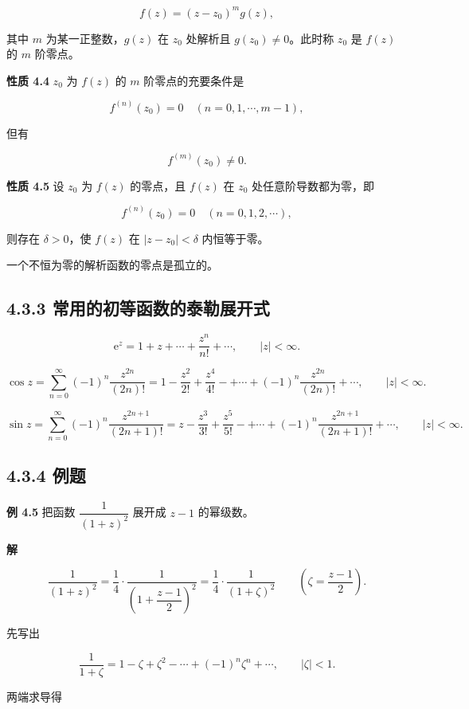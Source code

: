 \[
f(z)=(z-z_0)^m g(z),
\]

其中 \(m\) 为某一正整数，\(g(z)\) 在 \(z_0\) 处解析且
\(g(z_0)\neq 0\)。此时称 \(z_0\) 是 \(f(z)\) 的 \(m\) 阶零点。

\textbf{性质 4.4} \(z_0\) 为 \(f(z)\) 的 \(m\) 阶零点的充要条件是

\[
f^{(n)}(z_0)=0\quad(n=0,1,\cdots,m-1),
\]

但有

\[
f^{(m)}(z_0)\neq 0 .
\]

\textbf{性质 4.5} 设 \(z_0\) 为 \(f(z)\) 的零点，且 \(f(z)\) 在 \(z_0\)
处任意阶导数都为零，即

\[
f^{(n)}(z_0)=0\quad(n=0,1,2,\cdots),
\]

则存在 \(\delta>0\)，使 \(f(z)\) 在 \(|z-z_0|<\delta\) 内恒等于零。

一个不恒为零的解析函数的零点是孤立的。

\subsection{4.3.3
常用的初等函数的泰勒展开式}\label{ux5e38ux7528ux7684ux521dux7b49ux51fdux6570ux7684ux6cf0ux52d2ux5c55ux5f00ux5f0f}

\[
\mathrm{e}^z=1+z+\cdots+\frac{z^n}{n!}+\cdots,\qquad |z|<\infty .
\]

\[
\cos z=\sum_{n=0}^{\infty}(-1)^n\frac{z^{2n}}{(2n)!}
=1-\frac{z^2}{2!}+\frac{z^4}{4!}-+\cdots+(-1)^n\frac{z^{2n}}{(2n)!}+\cdots,\qquad |z|<\infty .
\]

\[
\sin z=\sum_{n=0}^{\infty}(-1)^n\frac{z^{2n+1}}{(2n+1)!}
=z-\frac{z^3}{3!}+\frac{z^5}{5!}-+\cdots+(-1)^n\frac{z^{2n+1}}{(2n+1)!}+\cdots,\qquad |z|<\infty .
\]

\subsection{4.3.4 例题}\label{ux4f8bux9898-2}

\textbf{例 4.5} 把函数 \(\dfrac{1}{(1+z)^2}\) 展开成 \(z-1\) 的幂级数。

\textbf{解}

\[
\frac{1}{(1+z)^2}=\frac{1}{4}\cdot\frac{1}{\left(1+\dfrac{z-1}{2}\right)^2}=\frac{1}{4}\cdot\frac{1}{(1+\zeta)^2}\qquad\left(\zeta=\frac{z-1}{2}\right).
\]

先写出

\[
\frac{1}{1+\zeta}=1-\zeta+\zeta^2-\cdots+(-1)^n\zeta^n+\cdots,\qquad|\zeta|<1 .
\]

两端求导得

